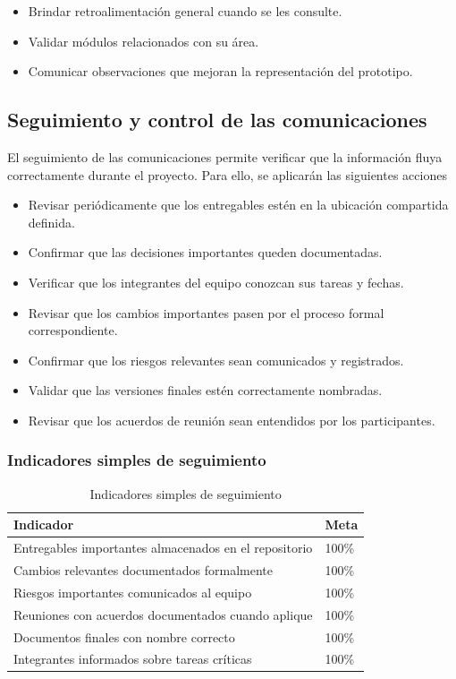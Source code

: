 \documentclass[11pt,spanish]{article}
\begin{document}
\begin{itemize}
    \item Brindar retroalimentación general cuando se les consulte.
    \item Validar módulos relacionados con su área.
    \item Comunicar observaciones que mejoran la representación del prototipo.
\end{itemize}

\subsection{Seguimiento y control de las comunicaciones}

El seguimiento de las comunicaciones permite verificar que la información fluya correctamente durante el proyecto. Para ello, se aplicarán las siguientes acciones

\begin{itemize}
    \item Revisar periódicamente que los entregables estén en la ubicación compartida definida.
    \item Confirmar que las decisiones importantes queden documentadas.
    \item Verificar que los integrantes del equipo conozcan sus tareas y fechas.
    \item Revisar que los cambios importantes pasen por el proceso formal correspondiente.
    \item Confirmar que los riesgos relevantes sean comunicados y registrados.
    \item Validar que las versiones finales estén correctamente nombradas.
    \item Revisar que los acuerdos de reunión sean entendidos por los participantes.
\end{itemize}

\subsubsection{Indicadores simples de seguimiento}

\begin{table}[H]
\centering
\caption{Indicadores simples de seguimiento}
\label{tab:indicadores-seguimiento}
\begin{tabularx}{\textwidth}{Y p{3cm}}
\toprule
\textbf{Indicador} & \textbf{Meta} \\
\midrule
Entregables importantes almacenados en el repositorio & 100\% \\
Cambios relevantes documentados formalmente & 100\% \\
Riesgos importantes comunicados al equipo & 100\% \\
Reuniones con acuerdos documentados cuando aplique & 100\% \\
Documentos finales con nombre correcto & 100\% \\
Integrantes informados sobre tareas críticas & 100\% \\
\bottomrule
\end{tabularx}
\end{table}
\end{document}
